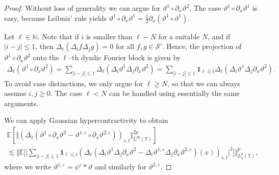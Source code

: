 \documentclass[11pt,a4paper]{article}
\theoremstyle{remark}
\newcommand{\N}{\mathbb{N}}
\newcommand{\E}{\mathbb{E}}
\newcommand{\CS}{\ensuremath{\mathscr{S}}}
\begin{document}
\begin{proof}
   Without loss of generality we can argue for $\vartheta^1 \circ \partial_x \vartheta^2$. The case $\vartheta^1 \circ \partial_x \vartheta^1$ is easy, because Leibniz' rule yields $\vartheta^1 \circ \partial_x \vartheta^1 = \frac{1}{2} \partial_x(\vartheta^1 \circ \vartheta^1)$.
  
   Let $\ell \in \N$. Note that if $i$ is smaller than $\ell - N$ for a suitable $N$, and if $| i - j | \leqslant 1$, then $\Delta_{\ell}(\Delta_i f \Delta_j g) = 0$ for all $f, g \in \CS'$. Hence, the projection of $\vartheta^1\circ \partial_x\vartheta^2$ onto the $\ell$--th dyadic Fourier block is given by
   \begin{align*}
      \Delta_{\ell} (\vartheta^1\circ \partial_x \vartheta^2 ) = \sum_{| i- j | \leqslant 1} \Delta_{\ell}(\Delta_i \vartheta^1 \Delta_j\partial_x \vartheta^2) = \sum_{|i-j|\leqslant 1} \mathbf{1}_{\ell \lesssim i} \Delta_{\ell} (\Delta_i \vartheta^1 \Delta_j \partial_x \vartheta^2).
   \end{align*}
   To avoid case distinctions, we only argue for $\ell \geqslant N$, so that we can always assume $i, j  \geqslant 0$. The case $\ell < N$ can be handled using essentially the same arguments.
      
   We can apply Gaussian hypercontractivity to obtain
   \begin{gather} \nonumber
      \E [\Vert  (\Delta_{\ell} ( \vartheta^1\circ \partial_x \vartheta^2 - \vartheta^{1,\varepsilon} \circ \partial_x \vartheta^{2,\varepsilon}) )_{s,t} \Vert_{L^{2 p}(\mathbb{T})}^{2 p}] \\ \label{eq:burgers area hypercontractivity}
      \lesssim \biggl\Vert  \E\biggl[\biggl| \sum_{|i-j| \leqslant 1} \mathbf{1}_{\ell \lesssim i} ( \Delta_{\ell} ( \Delta_i \vartheta^1 \Delta_j \partial_x \vartheta^2 -  \Delta_i \vartheta^{1,\varepsilon} \Delta_j \partial_x \vartheta^{2,\varepsilon} )(x))_{s,t}\biggr|^2\biggr] \biggr\Vert_{L^p_x(\mathbb{T})}^p,
   \end{gather}
   where we write $\vartheta^{1, \varepsilon} = \psi^\varepsilon \ast \vartheta$ and similarly for $\vartheta^{2, \varepsilon}$. 
   

\end{proof}
\end{document}

